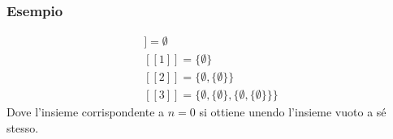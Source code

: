 \documentclass[12pt]{article}
\begin{document}
\subsubsection{Esempio}
\begin{gather*}
    [[0]] = \emptyset\\
    [[1]] = \{\emptyset\}\\
    [[2]] = \{\emptyset, \{\emptyset\}\}\\
    [[3]] = \{\emptyset, \{\emptyset\}, \{\emptyset, \{\emptyset\}\}\}
\end{gather*}
Dove l'insieme corrispondente a $n=0$ si ottiene unendo l'insieme vuoto a sé stesso.
\end{document}
